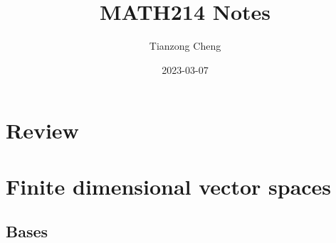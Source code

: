 \documentclass{article}
\title{MATH214 Notes}
\author{Tianzong Cheng}
\date{2023-03-07}
\begin{document}
\maketitle

\section{Review}

\section{Finite dimensional vector spaces}

\subsection{Bases}
\end{document}
